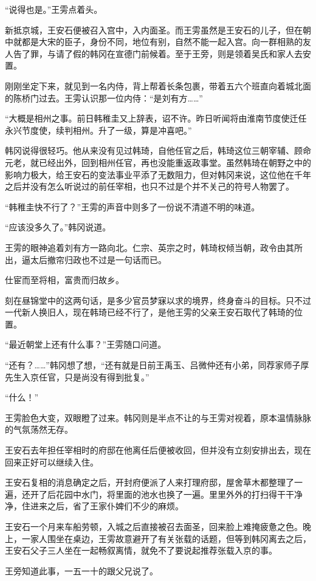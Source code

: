 “说得也是。”王雱点着头。

新抵京城，王安石便被召入宫中，入内面圣。而王雱虽然是王安石的儿子，但在朝中就都是大宋的臣子，身份不同，地位有别，自然不能一起入宫。向一群相熟的友人告了罪，与请了假的韩冈在宣德门前候着。至于王旁，则是领着吴氏和家人去安置。

刚刚坐定下来，就见到一名内侍，背上帮着长条包裹，带着五六个班直向着城北面的陈桥门过去。王雱认识那一位内侍：“是刘有方……”

“大概是相州之事。前日韩稚圭又上辞表，诏不许。昨日听闻将由淮南节度使迁任永兴节度使，续判相州。升了一级，算是冲喜吧。”

韩冈说得很轻巧。他从来没有见过韩琦，自他任官之后，韩琦这位三朝宰辅、顾命元老，就已经出外，回到相州任官，再也没能重返政事堂。虽然韩琦在朝野之中的影响力极大，给王安石的变法事业平添了无数阻力，但对韩冈来说，这位他在千年之后并没有怎么听说过的前任宰相，也只不过是个并不关己的符号人物罢了。

“韩稚圭快不行了？”王雱的声音中则多了一份说不清道不明的味道。

“应该没多久了。”韩冈说道。

王雱的眼神追着刘有方一路向北。仁宗、英宗之时，韩琦权倾当朝，政令由其所出，逼太后撤帘归政也不过是一句话而已。

仕宦而至将相，富贵而归故乡。

刻在昼锦堂中的这两句话，是多少官员梦寐以求的境界，终身奋斗的目标。只不过一代新人换旧人，现在韩琦已经不行了，是他王雱的父亲王安石取代了韩琦的位置。

“最近朝堂上还有什么事？”王雱随口问道。

“还有？……”韩冈想了想，“还有就是日前王禹玉、吕微仲还有小弟，同荐家师子厚先生入京任官，只是尚没有得到批复。”

“什么！”

王雱脸色大变，双眼瞪了过来。韩冈则是半点不让的与王雱对视着，原本温情脉脉的气氛荡然无存。

王安石去年担任宰相时的府邸在他离任后便被收回，但并没有立刻安排出去，现在回来正好可以继续入住。

王安石复相的消息确定之后，开封府便派了人来打理府邸，屋舍草木都整理了一遍，还开了后花园中水门，将里面的池水也换了一遍。里里外外的打扫得干干净净，住进来之后，省了王家仆婢们不少的麻烦。

王安石一个月来车船劳顿，入城之后直接被召去面圣，回来脸上难掩疲惫之色。晚上，一家人围坐在桌边，王雱故意避开了有关张载的话题，但等到韩冈离去之后，王安石父子三人坐在一起畅叙离情，就免不了要说起推荐张载入京的事。

王旁知道此事，一五一十的跟父兄说了。


